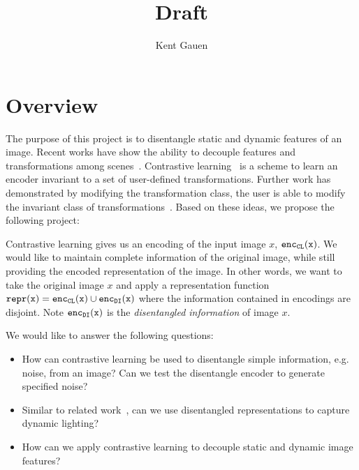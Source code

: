\documentclass[11pt]{article}
\author{Kent Gauen}
\title{Draft}
\begin{document}
\maketitle

\section{Overview}

The purpose of this project is to disentangle static and dynamic features of an image.
Recent works have show the ability to decouple features and transformations among scenes~\cite{liu2020learning}. Contrastive learning~\cite{chen2020simple,xiao2020should} is a scheme to learn an encoder invariant to a set of user-defined transformations. Further work has demonstrated by modifying the transformation class, the user is able to modify the invariant class of transformations~\cite{xiao2020should}. Based on these ideas, we propose the following project:

Contrastive learning gives us an encoding of the input image $x$, $\tt{enc}_{CL}(x)$. We would like to maintain complete information of the original image, while still providing the encoded representation of the image. In other words, we want to take the original image $x$ and apply a representation function $\tt{repr}(x) = \tt{enc}_{CL}(x) \cup \tt{enc}_{DI}(x)$ where the information contained in encodings are disjoint. Note $\tt{enc}_{DI}(x)$ is the \emph{disentangled information} of image $x$. 

We would like to answer the following questions:


\begin{itemize}
\item How can contrastive learning be used to disentangle simple information, e.g. noise, from an image? Can we test the disentangle encoder to generate specified noise?
\item Similar to related work~\cite{xiao2020should}, can we use disentangled representations to capture dynamic lighting?
\item How can we apply contrastive learning to decouple static and dynamic image features?
\end{itemize}
\end{document}
